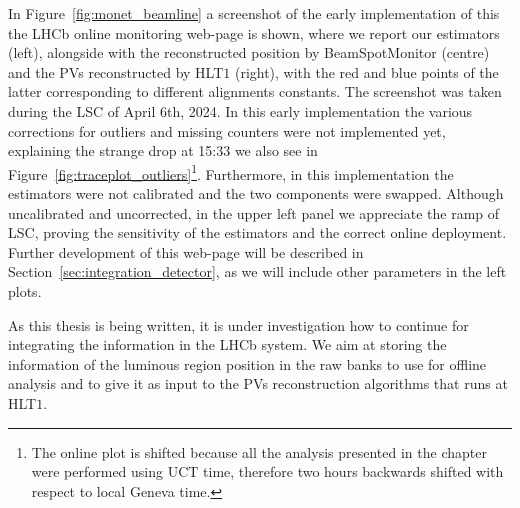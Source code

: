 In Figure~\ref{fig:monet_beamline} a screenshot of the early implementation of this the LHCb online monitoring web-page is shown, where we report our estimators (left), alongside with the reconstructed position by BeamSpotMonitor (centre) and the PVs reconstructed by HLT$1$ (right), with the red and blue points of the latter corresponding to different alignments constants. The screenshot was taken during the LSC of April 6th, 2024. In this early implementation the various corrections for outliers and missing counters were not implemented yet, explaining the strange drop at 15:33 we also see in Figure~\ref{fig:traceplot_outliers}\footnote{The online plot is shifted because all the analysis presented in the chapter were performed using UCT time, therefore two hours backwards shifted with respect to local Geneva time.}. Furthermore, in this implementation the estimators were not calibrated and the two components were swapped. Although uncalibrated and uncorrected, in the upper left panel we appreciate the ramp of LSC, proving the sensitivity of the estimators and the correct online deployment.
Further development of this web-page will be described in Section~\ref{sec:integration_detector}, as we will include other parameters in the left plots.

As this thesis is being written, it is under investigation how to continue for integrating the information in the LHCb system. We aim at storing the information of the luminous region position in the raw banks to use for offline analysis and to give it as input to the PVs reconstruction algorithms that runs at HLT$1$. 
